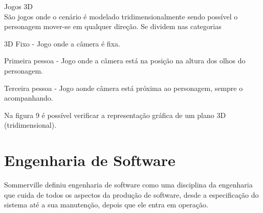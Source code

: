 \begin{alineascomponto}

\item Jogos 3D\\
São jogos onde o cenário é modelado tridimensionalmente sendo possível o personagem mover-se em qualquer direção.
Se dividem nas categorias
\begin{alineascomponto}
\item 3D Fixo - Jogo onde a câmera é fixa.
\item Primeira pessoa - Jogo onde a câmera está na posição na altura dos olhos do personagem.
\item Terceira pessoa - Jogo aonde câmera está próxima ao personagem, sempre o acompanhando. 
\end{alineascomponto}
Na figura 9 é possível verificar a representação gráfica de um plano 3D (tridimensional). \cite{graf}
\end{alineascomponto}
\pagebreak
\begin{figure}[h!]
		\centering
	\end{figure}
	

\section{Engenharia de Software}
\label{sec:engenharia-de-software}

Sommerville  definiu engenharia de software como uma disciplina da engenharia que cuida de todos os aspectos da produção de software, desde a especificação do sistema até a sua manutenção, depois que ele entra em operação.

